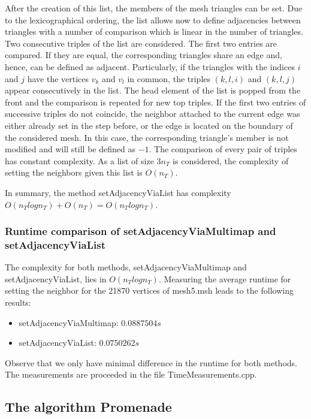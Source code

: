 \documentclass[10pt]{article}
\begin{document}
After the creation of this list, the members of the mesh triangles can be set. Due to the lexicographical ordering, the list allows now to define adjacencies between triangles with a number of comparison which is linear in the number of triangles. Two consecutive triples of the list are considered. The first two entries are compared. If they are equal, the corresponding triangles share an edge and, hence, can be defined as adjacent. Particularly, if the triangles with the indices $i$ and $j$ have the vertices $v_k$ and $v_l$ in common, the triples $({k},{l},i)$ and $({k},{l},j)$ appear consecutively in the list. The head element of the list is popped from the front and the comparison is repeated for new top triples. If the first two entries of successive triples do not coincide, the neighbor attached to the current edge was either already set in the step before, or the edge is located on the boundary of the considered mesh. In this case, the corresponding triangle's member is not modified and will still be defined as $-1$. The comparison of every pair of triples has constant complexity. As a list of size $3 n_T$ is considered, the complexity of setting the neighbors given this list is $O(n_T)$.

In summary, the method {\ttfamily setAdjacencyViaList} has complexity $O(n_Tlogn_T) + O(n_T) = O(n_Tlogn_T)$.

\subsubsection{Runtime comparison of setAdjacencyViaMultimap and setAdjacencyViaList}

The complexity for both methods, {\ttfamily setAdjacencyViaMultimap} and {\ttfamily setAdjacencyViaList}, lies in $O(n_Tlogn_T)$. Measuring the average runtime for setting the neighbor for the 21870 vertices of mesh5.msh leads to the following results: 

\begin{itemize}
	\item {\ttfamily setAdjacencyViaMultimap}: $ 0.0887504 s$
	\item {\ttfamily setAdjacencyViaList}: $ 0.0750262 s $
\end{itemize}

Observe that we only have minimal difference in the runtime for both methods. The measurements are proceeded in the file TimeMeasurements.cpp.


\subsection{The algorithm Promenade} \label{promenade}
\end{document}

